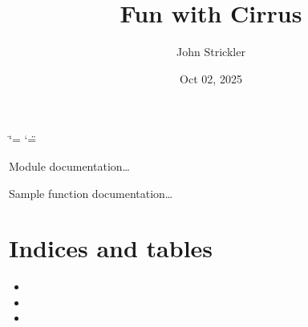 \documentclass[letterpaper,10pt,english]{sphinxmanual}
\title{Fun with Cirrus}
\date{Oct 02, 2025}
\author{John Strickler}
\begin{document}
\ifdefined\shorthandoff
  \ifnum\catcode`\=\string=\active\shorthandoff{=}\fi
  \ifnum\catcode`\"=\active{}\fi
\fi

\pagestyle{empty}
\sphinxmaketitle
\pagestyle{plain}
\sphinxtableofcontents
\pagestyle{normal}
\label{\detokenize{index::doc}}

\label{\detokenize{index:module-cirrus}}
\sphinxAtStartPar
Module documentation…

\begin{fulllineitems}
\label{\detokenize{index:cirrus.sample_function}}
\pysigstartsignatures
\pysiglinewithargsret
{}
{}
{}
\pysigstopsignatures
\sphinxAtStartPar
Sample function documentation…

\end{fulllineitems}



\chapter{Indices and tables}
\label{\detokenize{index:indices-and-tables}}\begin{itemize}
\item {} 
\sphinxAtStartPar
{}

\item {} 
\sphinxAtStartPar
{}

\item {} 
\sphinxAtStartPar
{}

\end{itemize}


\renewcommand{\indexname}{Python Module Index}
\begin{sphinxtheindex}
\let\bigletter\sphinxstyleindexlettergroup
\bigletter{c}
\item\relax{}
\end{sphinxtheindex}

\renewcommand{\indexname}{Index}
\printindex
\end{document}
